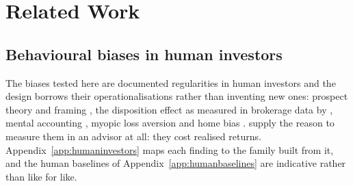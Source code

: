 \section{Related Work}

\subsection{Behavioural biases in human investors}
\label{sec:humaninvestors}
\ifsubmission
The biases tested here are documented regularities in human investors and the
design borrows their operationalisations rather than inventing new ones:
prospect theory \citep{kahneman1979prospect} and framing
\citep{tversky1981framing}, the disposition effect
\citep{shefrin1985disposition} as measured in brokerage data by
\citet{odean1998losses}, mental accounting \citep{thaler1985mental}, myopic
loss aversion \citep{benartzi1995myopic} and home bias
\citep{french1991homebias}. \citet{barber2000hazardous} supply the reason to
measure them in an advisor at all: they cost realised returns.
Appendix~\ref{app:humaninvestors} maps each finding to the family built from
it, and the human baselines of Appendix~\ref{app:humanbaselines} are
indicative rather than like for like.
\else

\fi

